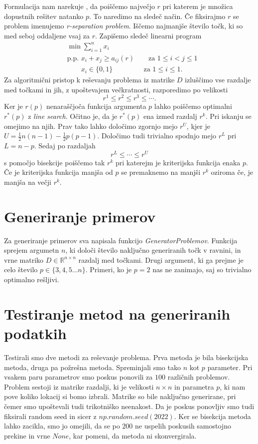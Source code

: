 \documentclass[a4paper]{article}
\begin{document}
Formulacija nam narekuje , da poiščemo največjo $ r $ pri katerem je množica dopustnih rešitev natanko $ p $.
To naredimo na sledeč način. Če fiksirajmo $ r $ se problem imenujemo \textit{r-separation problem}. Iščemo najmanjše število
točk, ki so med seboj oddaljene vsaj za $ r $. Zapišemo sledeč linearni program
\begin{align*}
    & \min \textstyle\sum_{i=1}^{n}x_i \\
    & \text{p.p. } x_i + x_j \geq a_{ij}(r) \qquad \text{za } 1 \leq i < j \leq 1 \\
    & \qquad x_i \in \{ 0,1 \} \,\;\qquad\qquad \text{za } 1 \leq i \leq 1.
\end{align*}
Za algoritmični pristop k reševanju problema iz matrike $ D $ izluščimo vse razdalje med točkami in jih, z
upoštevajem večkratnosti, razporedimo po velikosti
\[
	r^1 \leq r^2 \leq r^3 \leq \cdots .
\]
Ker je $ r(p) $ nenaraščjoča funkcija argumenta $ p $ lahko poiščemo optimalni $ r^*(p) $ z \textit{line search}.
Očitno je, da je $ r^*(p) $ ena izmed razdalj $ r^k $. Pri iskanju se omejimo na njih. Prav tako lahko določimo
zgornjo mejo $ r^U $, kjer je $ U = \frac{1}{2}n(n-1) - \frac{1}{2}p(p-1) $. Določimo tudi trivialno
spodnjo mejo $ r^L $ pri $ L = n - p $. Sedaj po razdaljah
\[
	r^L \leq \cdots \leq r^U
\]
s pomočjo bisekcije poiščemo tak $ r^k $ pri katerejm je kriterijska funkcija enaka $ p $.
Če je kriterijska funkcija manjša od $ p $ se premaknemo na manjši $ r^k $ oziroma če, je 
manjša na večji $ r^k $.

\section{Generiranje primerov}

Za generiranje primerov sva napisala funkcijo \textit{GeneratorProblemov}. Funkcija 
sprejem argumetn $ n $, ki določi število naključno generiranih točk v ravnini, in 
vrne matriko $ D \in \mathbb{R}^{n \times n} $ razdalj med točkami. Drugi argument, ki ga prejme
je celo število $ p \in \{ 3, 4, 5 \ldots n \} $. Primeri, ko je $ p = 2 $ nas ne
zanimajo, saj so trivialno optimalno rešljivi.

\section{Testiranje metod na generiranih podatkih}

Testirali smo dve metodi za reševanje problema. Prva metoda je bila bisekcijska metoda, druga pa požrešna metoda. Spreminjali smo tako $n$ kot $p$ parameter. Pri vsakem paru parametrov smo poskus ponovili za $100$ različnih problemov. Problem sestoji iz matrike razdalji, ki je velikosti $n \times n$ in parametra $p$, ki nam pove koliko lokacij si bomo izbrali. Matrike so bile naključno generirane, pri čemer smo upoštevali tudi trikotniško neenakost. Da je poskus ponovljiv smo tudi fiksirali random seed in sicer z $np.random.seed(2022)$. Ker se bisekcija metoda lahko zacikla, smo jo omejili, da se po $200$ ne uspelih poskusih samostojno prekine in vrne $None$, kar pomeni, da metoda ni skonvergirala.
\end{document}
